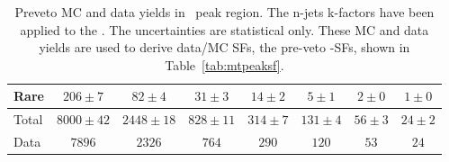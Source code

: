 \begin{table}[!h]
\begin{center}
\begin{tabular}{l||c|c|c|c|c|c|c}
Rare 		 & $206 \pm 7$& $82 \pm 4$& $31 \pm 3$& $14 \pm 2$& $5 \pm 1$& $2 \pm 0$& $1 \pm 0$ \\
\hline
Total 		 & $8000 \pm 42$& $2448 \pm 18$& $828 \pm 11$& $314 \pm 7$& $131 \pm 4$& $56 \pm 3$& $24 \pm 2$ \\
\hline
\hline
Data 		 & $7896$& $2326$& $764$& $290$& $120$& $53$& $24$ \\
\hline
\end{tabular}
\caption{ Preveto MC and data yields in \mt\ peak region. The
  n-jets k-factors have been applied to the \ttdl. The uncertainties
  are statistical only.
  These MC and data yields are used to derive data/MC SFs, the pre-veto \mt-SFs, shown in Table~\ref{tab:mtpeaksf}.
\label{tab:pvmtpeakyields}}
\end{center}
\end{table}


